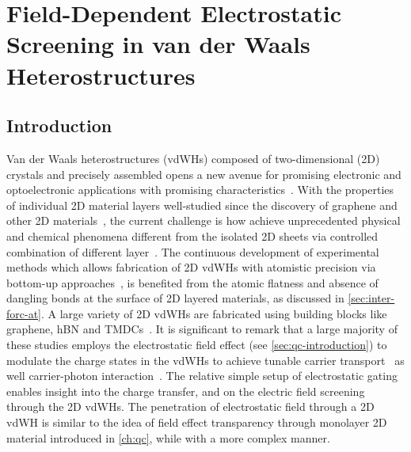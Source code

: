\chapter{Field-Dependent Electrostatic Screening in van der Waals Heterostructures}
\label{ch:asym}
\renewcommand*\imgdir{img/asym/}


\vspace{1em}


\newcommand*{\E}{\mathscr{E}}


\section{Introduction}
\label{sec:asym-introduction}


Van der Waals heterostructures (vdWHs) composed of two-dimensional
(2D) crystals and precisely assembled opens a new avenue for promising
electronic and optoelectronic applications with promising
characteristics~\autocite{Geim_2013_2D_vdw_Het,Jariwala_2016_mixed_vdw_het,Novoselov_2016_vdW,Liu_2016_rev,Withers_2015_LED_vde_Het,Britnell_2012_FET}.
%
With the properties of individual 2D material layers well-studied
since the discovery of graphene and other 2D
materials~\autocite{Novoselov_2005_2D_crystal},
%
the current challenge is how achieve unprecedented physical and chemical
phenomena different from the isolated 2D sheets via controlled
combination of different layer~\autocite{Geim_2013_2D_vdw_Het}.
%
The continuous development of experimental methods which allows
fabrication of 2D vdWHs with atomistic precision via bottom-up
approaches~\autocite{Jariwala_2016_mixed_vdw_het,Novoselov_2016_vdW,Liu_2016_rev},
is benefited from the
atomic flatness and absence of dangling bonds at the surface of 2D
layered materials, as discussed in \autoref{sec:inter-forc-at}.
%
A large variety of 2D vdWHs are fabricated using building
blocks like graphene, hBN and
TMDCs~\autocite{Dean_2010_BN_gr_highquality,Xue_2011_STM,Withers_2015_LED_vde_Het,Britnell_2012_FET,Cui_2015_multiterm_mos2}.
%
It is significant to remark that a large majority of these studies
employs the electrostatic field effect (see
\autoref{sec:qc-introduction}) to modulate the charge states in the
vdWHs to achieve tunable carrier
transport~\autocite{Britnell_2012_FET,Dean_2013_butterfly} as well
carrier-photon
interaction~\autocite{Britnell_2013_vdWE,Withers_2015_LED_vde_Het}.
%
%
The relative simple setup of electrostatic gating enables insight into the charge transfer, and on the
electric field screening through the 2D vdWHs.
%
The penetration of electrostatic field through a 2D vdWH is similar to the idea of field effect transparency through mono\-layer 2D material introduced in
\autoref{ch:qc}, while with a more complex manner.

